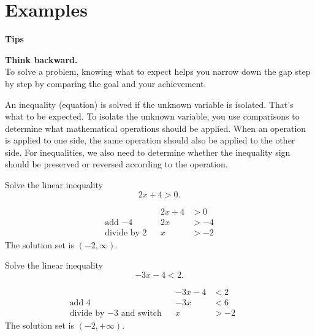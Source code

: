 \documentclass[en,12pt]{elegantbook}
\newenvironment{rmdtip}{
	\par\noindent
	{
		\makebox[-\width][r]{
			\footnotesize\color{red!90}
            \HandRight
			\hspace*{1pt}
		}
			\textbf{
				\color{second}
				\hspace*{3pt}
				Tips 
			}
    }
    \begin{shaded}
    \sffamily
}{
    \par\medskip\ignorespacesafterend
    \end{shaded}
}
\let\BeginKnitrBlock\begin \let\EndKnitrBlock\end
\begin{document}
\hypertarget{examples}{%
\section{Examples}\label{examples}}

\begin{rmdtip}

\textbf{Think backward.}\\
To solve a problem, knowing what to expect helps you narrow down the gap step by step by comparing the goal and your achievement.

An inequality (equation) is solved if the unknown variable is isolated. That's what to be expected. To isolate the unknown variable, you use comparisons to determine what mathematical operations should be applied. When an operation is applied to one side, the same operation should also be applied to the other side. For inequalities, we also need to determine whether the inequality sign should be preserved or reversed according to the operation.

\end{rmdtip}

\BeginKnitrBlock{example}
\protect\hypertarget{exm:unnamed-chunk-194}{}{\label{exm:unnamed-chunk-194} }
Solve the linear inequality
\[
2x+4>0.
\]
\EndKnitrBlock{example}

\BeginKnitrBlock{solution}


\[
\begin{aligned}
&  & 2x+4 & >0  \\
    \text{add $-4$}      &  & 2x   & >-4 \\
    \text{divide by $2$} &  & x    & >-2
\end{aligned}
\]
The solution set is \((-2, \infty)\).
\EndKnitrBlock{solution}

\BeginKnitrBlock{example}
\protect\hypertarget{exm:unnamed-chunk-196}{}{\label{exm:unnamed-chunk-196} }
Solve the linear inequality
\[
-3x-4<2.
\]
\EndKnitrBlock{example}

\BeginKnitrBlock{solution}


\[
\begin{aligned}
                                        &  & -3x-4 & <2       \\
    \text{add $4$}                   &  & -3x   & <6  &  & \\
    \text{divide by $-3$ and switch} &  & x     & >-2
\end{aligned}
\]
The solution set is \((-2, +\infty)\).
\EndKnitrBlock{solution}
\end{document}
